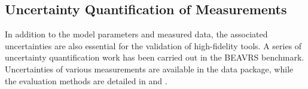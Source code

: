 %

\subsection{Uncertainty Quantification of Measurements}
\label{sec:uq_measurements}

In addition to the model parameters and measured data, the associated uncertainties
are also essential for the validation of high-fidelity tools.
A series of uncertainty quantification work has been carried out in the BEAVRS
benchmark. Uncertainties of various measurements are available in the data package,
while the evaluation methods are detailed in \cite{liang2017uq_beavrs} and \cite{kumar2018final_report}.
